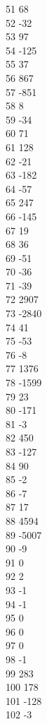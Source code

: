 { 51	68 \\
 52	-32 \\
 53	97 \\
 54	-125 \\
 55	37 \\
 56	867 \\
 57	-851 \\
 58	8 \\
 59	-34 \\
 60	71 \\
 61	128 \\
 62	-21 \\
 63	-182 \\
 64	-57 \\
 65	247 \\
 66	-145 \\
 67	19 \\
 68	36 \\
 69	-51 \\
 70	-36 \\
 71	-39 \\
 72	2907 \\
 73	-2840 \\
 74	41 \\
 75	-53 \\
 76	-8 \\
 77	1376 \\
 78	-1599 \\
 79	23 \\
 80	-171 \\
 81	-3 \\
 82	450 \\
 83	-127 \\
 84	90 \\
 85	-2 \\
 86	-7 \\
 87	17 \\
 88	4594 \\
 89	-5007 \\
 90	-9 \\
 91	0 \\
 92	2 \\
 93	-1 \\
 94	-1 \\
 95	0 \\
 96	0 \\
 97	0 \\
 98	-1 \\
 99	283 \\
 100	178 \\
 101	-128 \\
 102	-3 \\
}
